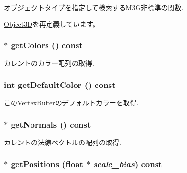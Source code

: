 オブジェクトタイプを指定して検索するM3G非標準の関数. 

\hyperlink{classm3g_1_1Object3D_4dadb21b568b0230fac106f15040138c}{Object3D}を再定義しています。\hypertarget{classm3g_1_1VertexBuffer_e3bdc8503242a6d278230352d03e5893}{
\subsubsection[{getColors}]{ $\ast$ getColors () const}}
\label{classm3g_1_1VertexBuffer_e3bdc8503242a6d278230352d03e5893}


カレントのカラー配列の取得. \hypertarget{classm3g_1_1VertexBuffer_4e33b93a98ce0632d51e7ae775ae5b1e}{
\subsubsection[{getDefaultColor}]{\setlength{\rightskip}{0pt plus 5cm}int getDefaultColor () const}}
\label{classm3g_1_1VertexBuffer_4e33b93a98ce0632d51e7ae775ae5b1e}


このVertexBufferのデフォルトカラーを取得. \hypertarget{classm3g_1_1VertexBuffer_0f4341d1215ff8f4efeaa40a21327c0c}{
\subsubsection[{getNormals}]{ $\ast$ getNormals () const}}
\label{classm3g_1_1VertexBuffer_0f4341d1215ff8f4efeaa40a21327c0c}


カレントの法線ベクトルの配列の取得. \hypertarget{classm3g_1_1VertexBuffer_5ca059361f9f834dd00b5d595bf3df0b}{
\subsubsection[{getPositions}]{ $\ast$ getPositions (float $\ast$ {\em scale\_\-bias}) const}}
\label{classm3g_1_1VertexBuffer_5ca059361f9f834dd00b5d595bf3df0b}


